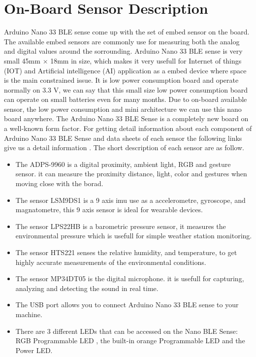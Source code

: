 \section{On-Board Sensor Description}

Arduino Nano 33 BLE sense come up with the set of embed sensor on the board. The available embed sensors are commonly use for measuring both the analog and digital values around the sorrounding. Arduino Nano 33 BLE sense is very small 45mm $\times$ 18mm in size, which  makes it very usefull for Internet of things (IOT) and Artificial intelligence (AI) application as a embed device where space is the main constrained issue. It is low power consumption board and operate normally on 3.3 V, we can say that this small size low power consumption board can operate on small batteries even for many months. Due to on-board available sensor, the low power consumption and mini architecture we can use this nano board anywhere. The Arduino Nano 33 BLE Sense is a completely new board on a well-known form factor. For getting detail information about each component of Arduino Nano 33 BLE Sense and data sheets of each sensor the following links give us a detail information \cite{Arduino:2021}. The short description of each sensor are as follow. 

\begin{itemize}
    \item The ADPS-9960 is a digital proximity, ambient light, RGB and gesture sensor. it can measure the proximity distance, light, color and gestures when moving close with the borad.
    \item The sensor LSM9DS1 is a 9 axis \ac{imu} use as a accelerometre, gyroscope, and magnatometre, this 9 axis sensor is ideal for wearable devices.
    \item The sensor LPS22HB is a barometric pressure sensor, it measures the environmental pressure which is usefull for simple weather station monitoring. 
    \item The sensor HTS221 senses the relative humidity, and temperature, to get highly accurate measurements of the environmental conditions.
    \item The sensor MP34DT05 is the digital microphone. it is usefull for capturing, analyzing and detecting the sound in real time.
    \item The USB port allows you to connect  Arduino Nano 33 BLE sense to your machine.
    \item There are 3 different LEDs that can be accessed on the Nano BLE Sense: RGB Programmable LED , the built-in  orange Programmable LED and the Power LED.
    
\end{itemize}

